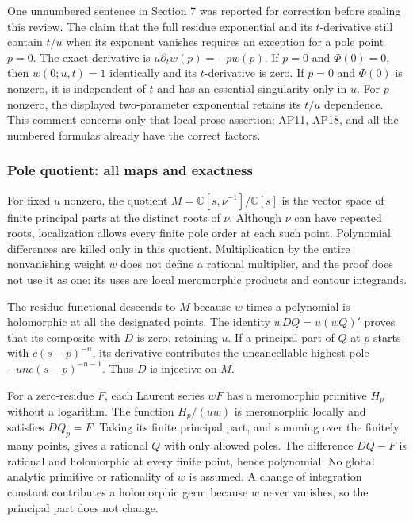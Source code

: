 One unnumbered sentence in Section 7 was reported for correction before sealing this review. The claim that the full residue exponential and its \(t\)-derivative still contain \(t/u\) when its exponent vanishes requires an exception for a pole point \(p=0\). The exact derivative is \(u\partial_t w(p)=-p w(p)\). If \(p=0\) and \(\Phi(0)=0\), then \(w(0;u,t)=1\) identically and its \(t\)-derivative is zero. If \(p=0\) and \(\Phi(0)\) is nonzero, it is independent of \(t\) and has an essential singularity only in \(u\). For \(p\) nonzero, the displayed two-parameter exponential retains its \(t/u\) dependence. This comment concerns only that local prose assertion; AP11, AP18, and all the numbered formulas already have the correct factors.

\subsubsection{Pole quotient: all maps and exactness}\label{endpoint-analytic_pole_review--pole-quotient-all-maps-and-exactness}

For fixed \(u\) nonzero, the quotient \(M=\mathbb C[s,\nu^{-1}]/\mathbb C[s]\) is the vector space of finite principal parts at the distinct roots of \(\nu\). Although \(\nu\) can have repeated roots, localization allows every finite pole order at each such point. Polynomial differences are killed only in this quotient. Multiplication by the entire nonvanishing weight \(w\) does not define a rational multiplier, and the proof does not use it as one: its uses are local meromorphic products and contour integrands.

The residue functional descends to \(M\) because \(w\) times a polynomial is holomorphic at all the designated points. The identity \(w DQ=u(wQ)'\) proves that its composite with \(D\) is zero, retaining \(u\). If a principal part of \(Q\) at \(p\) starts with \(c(s-p)^{-n}\), its derivative contributes the uncancellable highest pole \(-u n c(s-p)^{-n-1}\). Thus \(D\) is injective on \(M\).

For a zero-residue \(F\), each Laurent series \(wF\) has a meromorphic primitive \(H_p\) without a logarithm. The function \(H_p/(u w)\) is meromorphic locally and satisfies \(DQ_p=F\). Taking its finite principal part, and summing over the finitely many points, gives a rational \(Q\) with only allowed poles. The difference \(DQ-F\) is rational and holomorphic at every finite point, hence polynomial. No global analytic primitive or rationality of \(w\) is assumed. A change of integration constant contributes a holomorphic germ because \(w\) never vanishes, so the principal part does not change.

